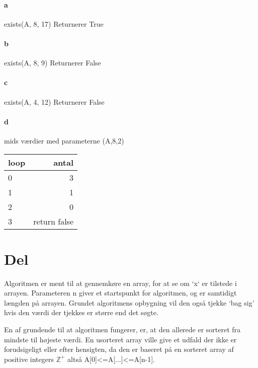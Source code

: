 \documentclass{article}
\begin{document}
\paragraph{a}
exists(A, 8, 17)
\newline
Returnerer True
\newline

\paragraph{b}
exists(A, 8, 9)
\newline
Returnerer False\newline

\paragraph{c}
exists(A, 4, 12)
\newline
Returnerer False \newline


\paragraph{d}

mids værdier med parameterne (A,8,2)\newline
\begin{tabular}{l | r}

	loop & antal \\ \hline
	\hline
	0 &  3 \\ \hline
	1 &  1 \\ \hline
	2 &  0 \\ \hline
	3 &  return false\\
	\hline
\end{tabular}

\section{Del}

Algoritmen er ment til at gennemkøre en array, for at se om `x` er tilstede i arrayen. Parameteren n giver et startspunkt for algoritmen, og er samtidigt længden på arrayen. Grundet algoritmens opbygning vil den også tjekke `bag sig' hvis den værdi der tjekkes er større end det søgte.\newline

En af grundende til at algoritmen fungerer, er, at den allerede er sorteret fra mindste til højeste værdi. En usorteret array ville give et udfald der ikke er forudsigeligt eller efter hensigten, da den er baseret på en sorteret array af positive integers $\mathbb{Z^+}$ altså A[0]<=A[...]<=A[n-1].
\end{document}
